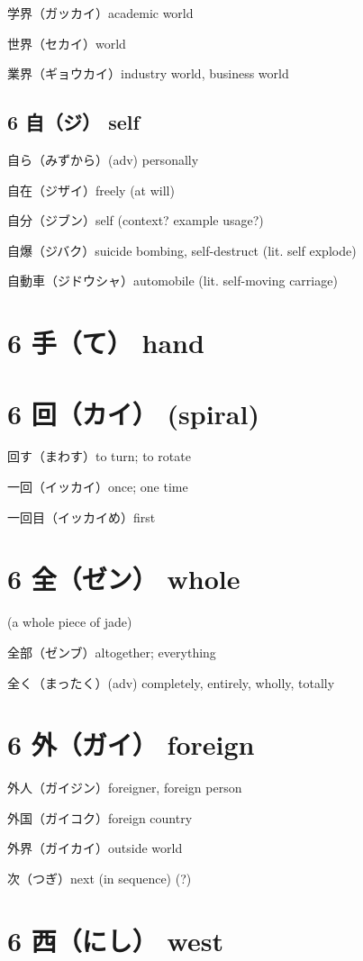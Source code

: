 学界（ガッカイ）academic world

世界（セカイ）world

業界（ギョウカイ）industry world, business world

\subsection{6 自（ジ） self}

自ら（みずから）(adv) personally

自在（ジザイ）freely (at will)

自分（ジブン）self (context? example usage?)

自爆（ジバク）suicide bombing, self-destruct (lit. self explode)

自動車（ジドウシャ）automobile (lit. self-moving carriage)

\section{6 手（て） hand}

\section{6 回（カイ） (spiral)}

回す（まわす）to turn; to rotate

一回（イッカイ）once; one time

一回目（イッカイめ）first

\section{6 全（ゼン） whole}

(a whole piece of jade)

全部（ゼンブ）altogether; everything

全く（まったく）(adv) completely, entirely, wholly, totally

\section{6 外（ガイ） foreign}

外人（ガイジン）foreigner, foreign person

外国（ガイコク）foreign country

外界（ガイカイ）outside world

次（つぎ）next (in sequence) (?)

\section{6 西（にし） west}


